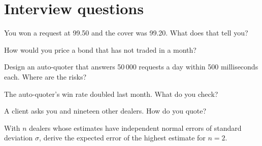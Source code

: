 \section{Interview questions}

\begin{interviewq}\label{iq:hf:bond-and-etf-request-for-quote-market-making:1}
You won a request at 99.50 and the cover was 99.20. What does that tell you?
\end{interviewq}

\begin{interviewq}\label{iq:hf:bond-and-etf-request-for-quote-market-making:2}
How would you price a bond that has not traded in a month?
\end{interviewq}

\begin{interviewq}\label{iq:hf:bond-and-etf-request-for-quote-market-making:3}
Design an auto-quoter that answers 50\,000 requests a day within 500 milliseconds each. Where are the risks?
\end{interviewq}

\begin{interviewq}\label{iq:hf:bond-and-etf-request-for-quote-market-making:4}
The auto-quoter's win rate doubled last month. What do you check?
\end{interviewq}

\begin{interviewq}\label{iq:hf:bond-and-etf-request-for-quote-market-making:5}
A client asks you and nineteen other dealers. How do you quote?
\end{interviewq}

\begin{interviewq}\label{iq:hf:bond-and-etf-request-for-quote-market-making:6}
With $n$ dealers whose estimates have independent normal errors of standard deviation $\sigma$, derive the expected error of the highest estimate for
$n=2$.
\end{interviewq}
